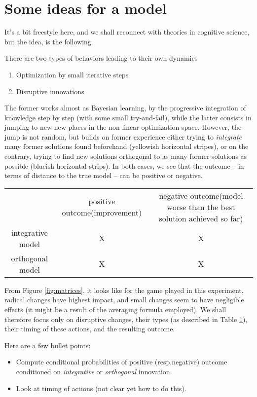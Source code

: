 \section{Some ideas for a model}

It's a bit freestyle here, and we shall reconnect with theories in cognitive science, but the idea, is the following. 

There are two types of behaviors leading to their own dynamics
\begin{enumerate}
\item Optimization by small iterative steps
\item Disruptive innovations
\end{enumerate}
  
The former works almost as Bayesian learning, by the progressive integration of knowledge step by step (with some small try-and-fail), while the latter consists in jumping to new new places in the non-linear optimization space. However, the jump is not random, but builds on former experience either trying to {\it integrate} many former solutions found beforehand (yellowish horizontal stripes), or on the contrary, trying to find new solutions orthogonal to as many former solutions as possible (blueish horizontal strips). In both cases, we see that the outcome -- in terms of distance to the true model -- can be positive or negative.

\begin{table} 
    \begin{tabular}{ c c c }
         & positive outcome(improvement) & negative outcome(model worse than the best solution achieved so far) \\ 
        integrative model & X  & X \\ 
        orthogonal model & X &  X \\ 
    \end{tabular}
\label{tab:table}
\end{table}

From Figure \ref{fig:matrices}, it looks like for the game played in this experiment, radical changes have highest impact, and small changes seem to have negligible effects (it might be a result of the averaging formula employed). We shall therefore focus only on disruptive changes, their types (as described in Table \ref{tab:table}), their timing of these actions, and the resulting outcome.

Here are a few bullet points:
\begin{itemize}
\item Compute conditional probabilities of positive (resp.negative) outcome conditioned on {\it integrative} or {\it orthogonal} innovation. 
\item Look at timing of actions (not clear yet how to do this).
\end{itemize}







  
  
  